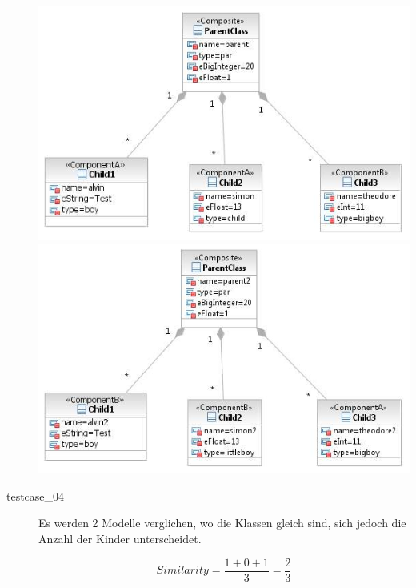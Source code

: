 \documentclass[a4paper]{article}
\begin{document}
\begin{description}
	\includegraphics[scale=0.5]{CompareChildrenEqualTypeTestScreens/Testcase03model1.jpeg}
	\includegraphics[scale=0.5]{CompareChildrenEqualTypeTestScreens/Testcase03model2.jpeg}

  \item[testcase\_04] Es werden 2 Modelle verglichen, wo die Klassen gleich sind, sich jedoch die Anzahl der Kinder unterscheidet.
  
   \begin{equation*}
   Similarity = \frac{1+0+1}{3}=\frac{2}{3}
   \end{equation*}
    

\end{description}
\end{document}
